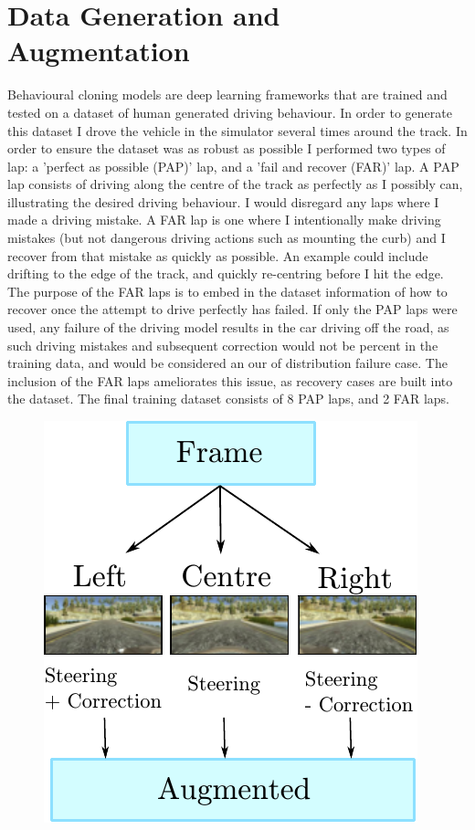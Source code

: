 \documentclass[letterpaper,12pt]{article}
\begin{document}
\section{Data Generation and Augmentation}
Behavioural cloning models are deep learning frameworks that are trained and tested on a dataset of human generated driving behaviour. In order to generate this dataset I drove the vehicle in the simulator several times around the track. In order to ensure the dataset was as robust as possible I performed two types of lap: a 'perfect as possible (PAP)' lap, and a 'fail and recover (FAR)' lap. A PAP lap consists of driving along the centre of the track as perfectly as I possibly can, illustrating the desired driving behaviour. I would disregard any laps where I made a driving mistake. A FAR lap is one where I intentionally make driving mistakes (but not dangerous driving actions such as mounting the curb) and I recover from that mistake as quickly as possible. An example could include drifting to the edge of the track, and quickly re-centring before I hit the edge. The purpose of the FAR laps is to embed in the dataset information of how to recover once the attempt to drive perfectly has failed. If only the PAP laps were used, any failure of the driving model results in the car driving off the road, as such driving mistakes and subsequent correction would not be percent in the training data, and would be considered an our of distribution failure case. The inclusion of the FAR laps ameliorates this issue, as recovery cases are built into the dataset. The final training dataset consists of 8 PAP laps, and 2 FAR laps.
\FloatBarrier
\begin{figure}
\centering
\includegraphics[scale=1.5]{../results/augment.pdf}
\end{figure}
\end{document}
